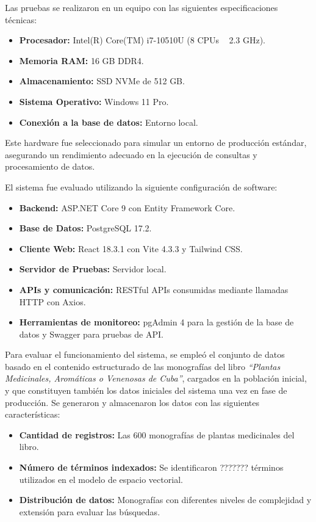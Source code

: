 Las pruebas se realizaron en un equipo con las siguientes especificaciones técnicas:

\begin{itemize}
    \item \textbf{Procesador:} Intel(R) Core(TM) i7-10510U (8 CPUs ~ 2.3 GHz).
    \item \textbf{Memoria RAM:} 16 GB DDR4.
    \item \textbf{Almacenamiento:} SSD NVMe de 512 GB.
    \item \textbf{Sistema Operativo:} Windows 11 Pro.
    \item \textbf{Conexión a la base de datos:} Entorno local.
\end{itemize}

Este hardware fue seleccionado para simular un entorno de producción estándar, asegurando un rendimiento 
adecuado en la ejecución de consultas y procesamiento de datos.

El sistema fue evaluado utilizando la siguiente configuración de software:

\begin{itemize}
    \item \textbf{Backend:} ASP.NET Core 9 con Entity Framework Core.
    \item \textbf{Base de Datos:} PostgreSQL 17.2.
    \item \textbf{Cliente Web:} React 18.3.1 con Vite 4.3.3 y Tailwind CSS.
    \item \textbf{Servidor de Pruebas:} Servidor local.
    \item \textbf{APIs y comunicación:} RESTful APIs consumidas mediante llamadas HTTP con Axios.
    \item \textbf{Herramientas de monitoreo:} pgAdmin 4 para la gestión de la base de datos y Swagger para pruebas de API.
\end{itemize}

Para evaluar el funcionamiento del sistema, se empleó el conjunto de datos basado en el contenido estructurado 
de las monografías del libro \textit{``Plantas Medicinales, Aromáticas o Venenosas de Cuba''}, cargados en la población inicial, 
y que constituyen también los datos iniciales del sistema una vez en fase de producción. Se generaron y 
almacenaron los datos con las siguientes características:

\begin{itemize}
    \item \textbf{Cantidad de registros:} Las 600 monografías de plantas medicinales del libro.
    \item \textbf{Número de términos indexados:} Se identificaron ??????? términos utilizados en el modelo de espacio vectorial.
    \item \textbf{Distribución de datos:} Monografías con diferentes niveles de complejidad y extensión para evaluar las búsquedas.
\end{itemize}





